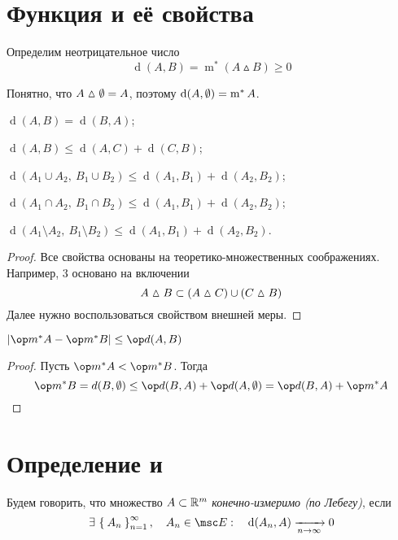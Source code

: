 \section{Функция  и её свойства}

Определим неотрицательное число
$$ \operatorname d(A, B) = \operatorname m^* (A \vartriangle B) \ge 0 $$

Понятно, что $ A \vartriangle \emptyset = A $, поэтому $ \operatorname d(A, \emptyset) = \operatorname m^* A $.

\begin{props}
	\item $ \operatorname d(A, B) = \operatorname d(B, A) $;
	\item $ \operatorname d(A, B) \le \operatorname d(A, C) + \operatorname d(C, B) $;
	\item $ \operatorname d(A_1 \cup A_2, ~ B_1 \cup B_2) \le \operatorname d(A_1, B_1) + \operatorname d(A_2, B_2) $;
	\item $ \operatorname d(A_1 \cap A_2, ~ B_1 \cap B_2) \le \operatorname d(A_1, B_1) + \operatorname d(A_2, B_2) $;
	\item $ \operatorname d(A_1 \setminus A_2, ~ B_1 \setminus B_2) \le \operatorname d(A_1, B_1) + \operatorname d(A_2, B_2) $.
\end{props}

\begin{proof}
	Все свойства основаны на теоретико-множественных соображениях. Например, 3 основано на включении
	$$ A \vartriangle B \subset (A \vartriangle C) \cup (C \vartriangle B) $$
	Далее нужно воспользоваться свойством  внешней меры.
\end{proof}

\begin{statement}
	$ |\op m^* A - \op m^* B| \le \op d(A, B) $
\end{statement}

\begin{proof}
	Пусть $ \op m^* A < \op m^* B $. Тогда
	$$ \op m^* B = d(B, \O) \le \op d(B, A) + \op d(A, \O) = \op d(B, A) + \op m^* A $$
\end{proof}

\section{Определение  и }

\begin{definition}
	Будем говорить, что множество $ A \subset \mathbb{R}^m $ \emph{конечно-измеримо (по Лебегу)}, если
	$$ \exist \set{A_n}_{n = 1}^\infty, \quad A_n \in \msc E : \quad \operatorname d(A_n, A) \underarr{n \to \infty} 0 $$
\end{definition}

